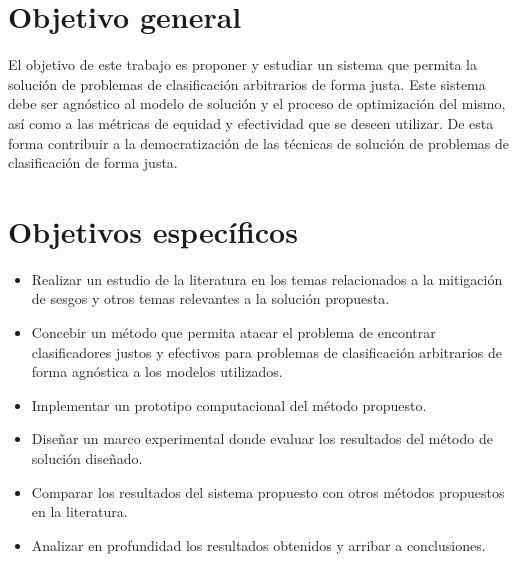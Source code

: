 \section*{Objetivo general}

El objetivo de este trabajo es proponer y estudiar un sistema que permita la solución de problemas de clasificación arbitrarios de forma justa.
Este sistema debe ser agnóstico al modelo de solución y el proceso de optimización del mismo, así como a las métricas de equidad y efectividad que se deseen utilizar.
De esta forma contribuir a la democratización de las técnicas de solución de problemas de clasificación de forma justa.

\section*{Objetivos específicos}

\begin{itemize}
    \item Realizar un estudio de la literatura en los temas relacionados a la mitigación de sesgos y otros temas relevantes a la solución propuesta.
    \item Concebir un método que permita atacar el problema de encontrar clasificadores justos y efectivos para problemas de clasificación arbitrarios de forma agnóstica a los modelos utilizados.
    \item Implementar un prototipo computacional del método propuesto.
    \item Diseñar un marco experimental donde evaluar los resultados del método de solución diseñado.
    \item Comparar los resultados del sistema propuesto con otros métodos propuestos en la literatura.
    \item Analizar en profundidad los resultados obtenidos y arribar a conclusiones.
\end{itemize}

